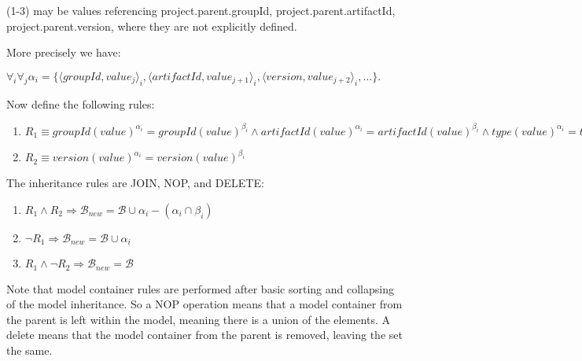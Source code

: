 \documentclass[12pt]{amsart}
\begin{document}
(1-3) may be values referencing project.parent.groupId, project.parent.artifactId, project.parent.version, where they are not explicitly defined.

More precisely we have:

\begin{math} \forall_i  \forall_j \alpha_i = \{\langle groupId, value_j \rangle_i, \langle artifactId, value_{j+1}\rangle_i, \langle version, value_{j+2}\rangle_i, \ldots\}.\end{math}

Now define the following rules:

\begin{enumerate}
\item 
 \begin{math} R_1 \equiv  
groupId(value)^{\alpha_i} = groupId(value)^{\beta_i}  \wedge artifactId(value)^{\alpha_i} = artifactId(value)^{\beta_i} \wedge type(value)^{\alpha_i} = type(value)^{\beta_i}  \wedge classifier(value)^{\alpha_i} = classifier(value)^{\beta_i} 
\end{math}
\item 
 \begin{math} R_2 \equiv  
version(value)^{\alpha_i} = version(value)^{\beta_i} 
\end{math}
\end{enumerate}


The inheritance rules are JOIN, NOP, and DELETE:

\begin{enumerate}
\item
\begin{math}
R_1 \wedge R_2 \Rightarrow \mathcal{B}_{new} = \mathcal{B} \cup \alpha_i - (\alpha_i \cap \beta_i)
\end{math}
\item
\begin{math}
\neg R_1\Rightarrow \mathcal{B}_{new} = \mathcal{B} \cup \alpha_i 
\end{math}
\item
\begin{math}
R_1 \wedge \neg R_2 \Rightarrow \mathcal{B}_{new} = \mathcal{B} \end{math}
\end{enumerate}

Note that model container rules are performed after basic sorting and collapsing of the model inheritance. So a NOP operation means that a model container from the parent is left within the model, meaning there is a union of the elements. A delete means that the model container from the parent is removed, leaving the set the same. 
\end{document}
